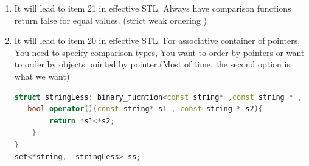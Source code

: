 \documentclass[a4paper,11pt,twoside]{book}
\begin{document}
\begin{itemize}
\begin{enumerate}
\begin{enumerate}
		\item It will lead to item 21 in effective STL. Always have comparison functions return false for equal values. (strict weak ordering )
  
  		\item It will lead to item 20 in effective STL. For associative container of pointers, You need to specify comparison types, You want to order by pointers or want to order by objects pointed by pointer.(Most of time, the second option is what we want)
\begin{lstlisting}[frame=single, language=c++]
struct stringLess: binary_fucntion<const string* ,const string * , bool>{
   bool operator()(const string* s1 , const string * s2){
        return *s1<*s2;
	}
}
set<*string,  stringLess> ss;
\end{lstlisting}

   \end{enumerate}
\end{enumerate}

\end{itemize}
\end{document}
